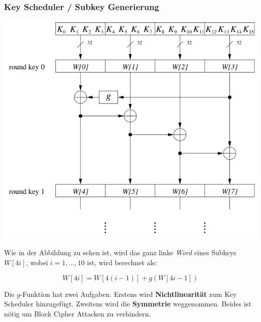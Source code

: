 \documentclass[
  10pt,
  a4paper,
]{article}
\begin{document}
\begin{multicols*}{2}
\begin{tcolorbox}
\end{tcolorbox}

\subsubsection{Key Scheduler / Subkey
Generierung}\label{key-scheduler-subkey-generierung}

\includegraphics{images/crypto/image-11.png}

Wie in der Abbildung zu sehen ist, wird das ganz linke \emph{Word} eines
Subkeys \(W[4i]\), wobei \(i = 1,\ldots,10\) ist, wird berechnet als:

\[
W[4i] = W[4(i-1)]+g(W[4i-1])
\]

\begin{tcolorbox}[enhanced jigsaw, coltitle=black, toprule=.15mm, colframe=quarto-callout-note-color-frame, breakable, titlerule=0mm, title=\textcolor{quarto-callout-note-color}{\faInfo}\hspace{0.5em}{g-Funktion}, toptitle=1mm, colback=white, leftrule=.75mm, bottomtitle=1mm, colbacktitle=quarto-callout-note-color!10!white, left=2mm, bottomrule=.15mm, rightrule=.15mm, arc=.35mm, opacityback=0, opacitybacktitle=0.6]

Die \(g\)-Funktion hat zwei Aufgaben. Erstens wird
\textbf{Nichtlinearität} zum Key Scheduler hinzugefügt. Zweitens wird
die \textbf{Symmetrie} weggenommen. Beides ist nötig um Block Cipher
Attacken zu verhindern.


\end{tcolorbox}
\end{multicols*}
\end{document}
